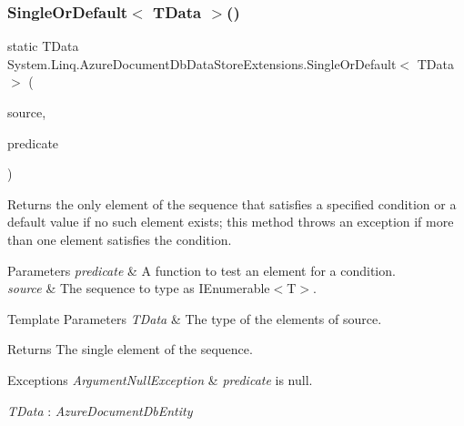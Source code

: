 \subsubsection{\texorpdfstring{Single\+Or\+Default$<$ T\+Data $>$()}{SingleOrDefault< TData >()}\hspace{0.1cm}{\footnotesize\ttfamily [2/2]}}
{\footnotesize\ttfamily static T\+Data System.\+Linq.\+Azure\+Document\+Db\+Data\+Store\+Extensions.\+Single\+Or\+Default$<$ T\+Data $>$ (\begin{DoxyParamCaption}\item[{this \hyperlink{classCqrs_1_1Azure_1_1DocumentDb_1_1DataStores_1_1AzureDocumentDbDataStore}{Azure\+Document\+Db\+Data\+Store}$<$ T\+Data $>$}]{source,  }\item[{Func$<$ T\+Data, bool $>$}]{predicate }\end{DoxyParamCaption})\hspace{0.3cm}{\ttfamily [static]}}



Returns the only element of the sequence that satisfies a specified condition or a default value if no such element exists; this method throws an exception if more than one element satisfies the condition. 


\begin{DoxyParams}{Parameters}
{\em predicate} & A function to test an element for a condition.\\
\hline
{\em source} & The sequence to type as I\+Enumerable$<$\+T$>$.\\
\hline
\end{DoxyParams}

\begin{DoxyTemplParams}{Template Parameters}
{\em T\+Data} & The type of the elements of source.\\
\hline
\end{DoxyTemplParams}
\begin{DoxyReturn}{Returns}
The single element of the sequence.
\end{DoxyReturn}

\begin{DoxyExceptions}{Exceptions}
{\em Argument\+Null\+Exception} & {\itshape predicate}  is null.\\
\hline
\end{DoxyExceptions}
\begin{Desc}
\item[Type Constraints]\begin{description}
\item[{\em T\+Data} : {\em Azure\+Document\+Db\+Entity}]\end{description}
\end{Desc}

